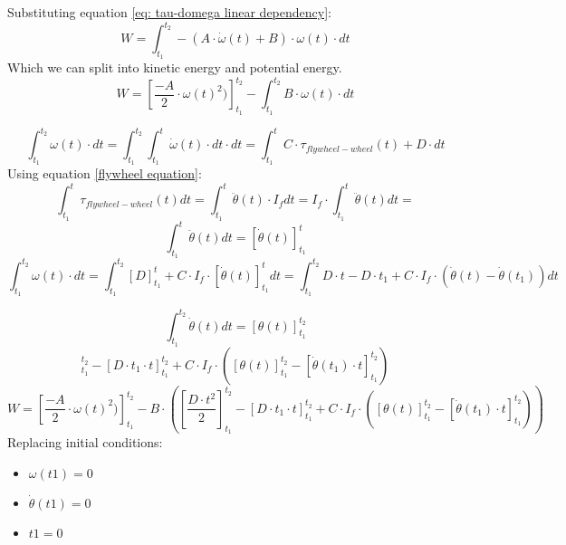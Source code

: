 \begin{enumerate}
    Substituting equation \ref{eq: tau-domega linear dependency}:
    \begin{equation*}
        W=\int_{t_1}^{t_2}-(A\cdot \dot{\omega}(t)+B)\cdot \omega(t) \cdot dt       
    \end{equation*}
    Which we can split into kinetic energy and potential energy.
    \begin{equation*}
        W=[\frac{-A}{2}\cdot \omega(t)^2)]_{t_1}^{t_2}-\int_{t_1}^{t_2} B\cdot \omega(t) \cdot dt       
    \end{equation*}

    
    \begin{equation*}
        \int_{t_1}^{t_2} \omega(t) \cdot dt  
        = \int_{t_1}^{t_2} \int_{t_1}^{t} \dot{\omega}(t) \cdot dt \cdot dt
        = \int_{t_1}^{t} C\cdot\tau_{flywheel-wheel}(t) + D\cdot dt    
    \end{equation*}
    Using equation \ref{flywheel equation}:
    \begin{equation*}
        \int_{t_1}^{t}\tau_{flywheel-wheel}(t) dt = 
        \int_{t_1}^{t}\ddot{\theta}(t)\cdot I_f dt = 
        I_f \cdot \int_{t_1}^{t}\ddot{\theta}(t) dt = 
    \end{equation*}
    \begin{equation*}
        \int_{t_1}^{t}\ddot{\theta}(t) dt = 
        [\dot{\theta}(t)]_{t_1}^{t} 
    \end{equation*}
    \begin{equation*}
        \int_{t_1}^{t_2} \omega(t) \cdot dt
        = \int_{t_1}^{t_2} [D]_{t_1}^{t} + C\cdot I_f \cdot[\dot{\theta}(t)]_{t_1}^t dt
        = \int_{t_1}^{t_2} D\cdot t - D \cdot t_1+ C\cdot I_f \cdot (\dot{\theta}(t)-\dot{\theta}(t_1)) dt     
    \end{equation*}

    \begin{equation*}
        \int_{t_1}^{t_2} \dot{\theta}(t) dt = [\theta(t)]_{t_1}^{t_2}
    \end{equation*}
    \begin{equation*}
        [\frac{D\cdot t^2}{2}]_{t_1}^{t_2} - [D \cdot t_1 \cdot t]_{t_1}^{t_2}+
        C\cdot I_f \cdot ([\theta(t)]_{t_1}^{t_2}-[\dot{\theta}(t_1)\cdot t]_{t_1}^{t_2})     
    \end{equation*}
    \begin{equation}
        \label{eq: Work equation}
        W=
        [\frac{-A}{2}\cdot \omega(t)^2)]_{t_1}^{t_2}-
        B \cdot (
        [\frac{D\cdot t^2}{2}]_{t_1}^{t_2} - [D \cdot t_1 \cdot t]_{t_1}^{t_2}+
        C\cdot I_f \cdot ([\theta(t)]_{t_1}^{t_2}-[\dot{\theta}(t_1)\cdot t]_{t_1}^{t_2}))     
    \end{equation}
    Replacing initial conditions:
    \begin{itemize}
        \item $\omega(t1)=0$
        \item $\dot{\theta}(t1)=0$
        \item $t1=0$
    \end{itemize}


\end{enumerate}
